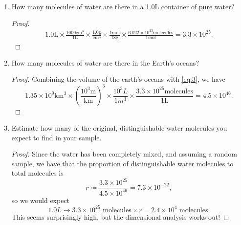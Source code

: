 \documentclass[12pt]{article}
\newenvironment{problem}[2][Problem]{\begin{trivlist}
    \item[\hskip \labelsep {\bfseries #1}\hskip \labelsep {\bfseries #2.}]}{\end{trivlist}}
\theoremstyle{definition}
\begin{document}
\begin{problem}{1}
  \begin{enumerate}[label=(\alph*)]
    \item How many molecules of water are there in a 1.0L container of pure water?
          \begin{proof}
            \begin{align}
            \label{eq:3}
1.0\text{L} \times \frac{1000 \text{cm}^3}{1\text{L}} \times \frac{1.0 \text{g}}{\text{cm}^3} \times \frac{1 \text{mol}}{18 \text{g}} \times \frac{6.022 \times 10^{23} \text{molecules}}{1 \text{mol}} = \boxed{3.3 \times 10 ^{25}}.
            \end{align}
          \end{proof}
    \item How many molecules of water are there in the Earth's oceans?
          \begin{proof}
            Combining the volume of the earth's oceans with \cref{eq:3}, we have
            \begin{equation}
            \label{eq:4}
            1.35 \times 10^9 \text{km}^3 \times \left(\frac{10^{3} \text{m}}{\text{km}}\right)^3 \times \frac{10^3 L}{1 m^3} \times \frac{3.3 \times 10^{25} \text{molecules}}{1 \text{L}} = \boxed{4.5 \times 10^{46}}.
            \end{equation}
          \end{proof}
    \item Estimate how many of the original, distinguishable water molecules you expect to find in your sample.
          \begin{proof}
            Since the water has been completely mixed, and assuming a random sample, we have that the proportion of distinguishable water molecules to total molecules is
            \begin{equation}
            \label{eq:5}
            r \coloneq \frac{3.3 \times 10^{25}}{4.5 \times 10^{46}} = 7.3 \times 10^{-22},
            \end{equation}
            so we would expect
            \begin{equation}
            \label{eq:10}
            1.0L \rightarrow 3.3 \times 10^{25} \text{ molecules} \times r = \boxed{2.4 \times 10^4 \text{ molecules}}.
            \end{equation}
            This seems surprisingly high, but the dimensional analysis works out!
          \end{proof}
  \end{enumerate}
\end{problem}
\end{document}
